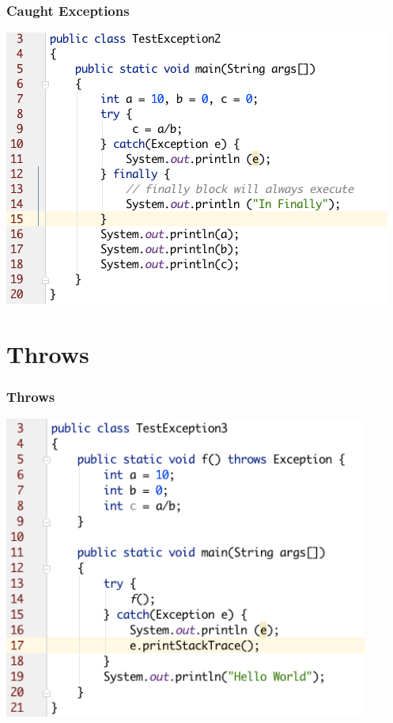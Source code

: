 \documentclass{beamer}
\begin{document}
\begin{frame}
\frametitle{Caught Exceptions}
\includegraphics[width=\textwidth]{CaughtException.png}
\end{frame}


\section{Throws}

\begin{frame}
\frametitle{Throws}
\includegraphics[width=0.9\textwidth]{Throws.png}
\end{frame}
\end{document}
